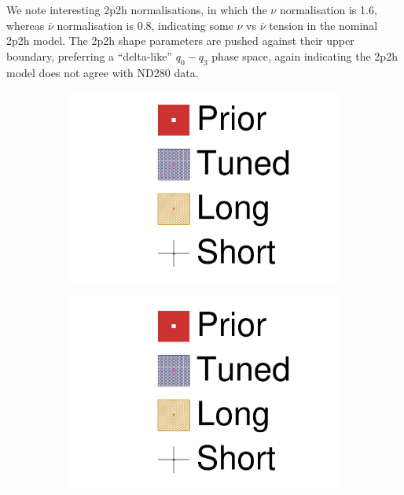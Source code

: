 We note interesting 2p2h normalisations, in which the $\nu$ normalisation is 1.6, whereas $\bar{\nu}$ normalisation is 0.8, indicating some $\nu$ vs $\bar{\nu}$ tension in the nominal 2p2h model. The 2p2h shape parameters are pushed against their upper boundary, preferring a ``delta-like'' $q_0-q_3$ phase space, again indicating the 2p2h model does not agree with ND280 data.
\begin{figure}[h]
	\begin{subfigure}[t]{0.2\textwidth}
		\includegraphics[width=\textwidth, trim={0mm 150mm 50mm 0mm}, clip,page=1]{figures/mach3/data/2017b_NewData_NewDet_UpdXsecStep_2Xsec_4Det_5Flux_0_2017b_June_NewDet_merge_2017b_NewDet_June_Long_0}
	\end{subfigure}
	\begin{subfigure}[t]{0.2\textwidth}
		\includegraphics[width=\textwidth, trim={0mm 100mm 50mm 50mm}, clip,page=1]{figures/mach3/data/2017b_NewData_NewDet_UpdXsecStep_2Xsec_4Det_5Flux_0_2017b_June_NewDet_merge_2017b_NewDet_June_Long_0}

\end{subfigure}
\end{figure}
